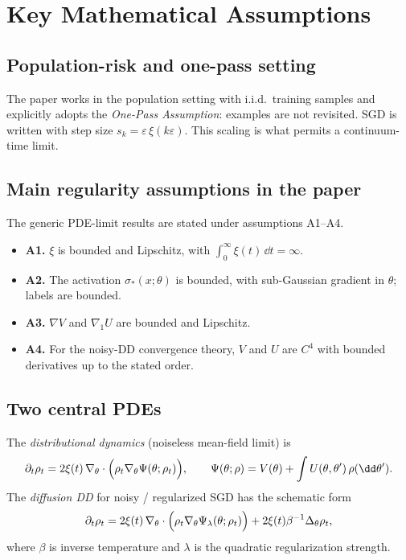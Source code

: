 \section{Key Mathematical Assumptions}

\subsection*{Population-risk and one-pass setting}
The paper works in the population setting with i.i.d.\ training samples and explicitly adopts the \emph{One-Pass Assumption}: examples are not revisited. SGD is written with step size
\(
s_k = \varepsilon \,\xi(k\varepsilon).
\)
This scaling is what permits a continuum-time limit.

\subsection*{Main regularity assumptions in the paper}
The generic PDE-limit results are stated under assumptions A1--A4.
\begin{itemize}[leftmargin=1.5em]
\item \textbf{A1.} $\xi$ is bounded and Lipschitz, with $\int_0^\infty \xi(t)\,\dd t=\infty$.
\item \textbf{A2.} The activation $\sigma_*(x;\theta)$ is bounded, with sub-Gaussian gradient in $\theta$; labels are bounded.
\item \textbf{A3.} $\nabla V$ and $\nabla_1 U$ are bounded and Lipschitz.
\item \textbf{A4.} For the noisy-DD convergence theory, $V$ and $U$ are $C^4$ with bounded derivatives up to the stated order.
\end{itemize}

\subsection*{Two central PDEs}
The \emph{distributional dynamics} (noiseless mean-field limit) is
\begin{equation}
\partial_t \rho_t
=
2\xi(t)\,\nabla_\theta \cdot \Bigl(\rho_t \nabla_\theta \Psi(\theta;\rho_t)\Bigr),
\qquad
\Psi(\theta;\rho)=V(\theta)+\int U(\theta,\theta')\,\rho(\dd\theta').
\end{equation}
The \emph{diffusion DD} for noisy / regularized SGD has the schematic form
\begin{equation}
\partial_t \rho_t
=
2\xi(t)\,\nabla_\theta \cdot \Bigl(\rho_t \nabla_\theta \Psi_\lambda(\theta;\rho_t)\Bigr)
 + 2\xi(t)\beta^{-1}\Delta_\theta \rho_t,
\end{equation}
where $\beta$ is inverse temperature and $\lambda$ is the quadratic regularization strength.

